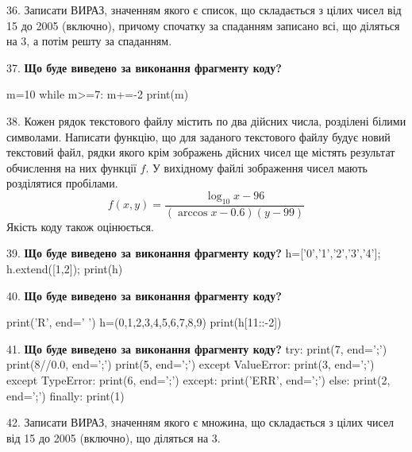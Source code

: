 \documentclass[11pt]{article}
\begin{document}
36. 
Записати ВИРАЗ, значенням якого є список, що складається з цілих чисел від 15 до 2005 (включно), причому спочатку за спаданням записано всі, що діляться на 3, а потім решту за спаданням.\par\vspace{5mm}

37. \textbf{Що буде виведено за виконання фрагменту коду?}

m=10
while m>=7:
    m+=-2
print(m)

\par\vspace{5mm}

38. 
Кожен рядок текстового файлу містить по два дійсних числа, розділені білими символами.
Написати функцію, що для заданого текстового файлу будує новий текстовий файл, рядки якого крім зображень дйсних чисел ще містять результат обчислення на них функції $f$. У вихідному файлі зображення чисел мають розділятися пробілами. 
$$f(x, y) =\frac{\log_{10} x - 96}{(\arccos x - 0.6) (y - 99)}$$ 
Якість коду також оцінюється.

\par\vspace{5mm}

39. \textbf{Що буде виведено за виконання фрагменту коду?}
h=['0','1','2','3','4']; h.extend([1,2]); print(h)\par\vspace{5mm}

40. \textbf{Що буде виведено за виконання фрагменту коду?}

print('R', end=' ')
h=(0,1,2,3,4,5,6,7,8,9)
print(h[11::-2])

\par\vspace{5mm}

41. \textbf{Що буде виведено за виконання фрагменту коду?}
try:
    print(7, end=';')
    print(8//0.0, end=';')
    print(5, end=';')
except ValueError:
    print(3, end=';')
except TypeError:
    print(6, end=';')
except:
    print('ERR', end=';')
else:
    print(2, end=';')
finally:
    print(1)
\par\vspace{5mm}

42. 
Записати ВИРАЗ, значенням якого є множина, що складається з цілих чисел від 15 до 2005 (включно), що діляться на 3.\par\vspace{5mm}
\end{document}
